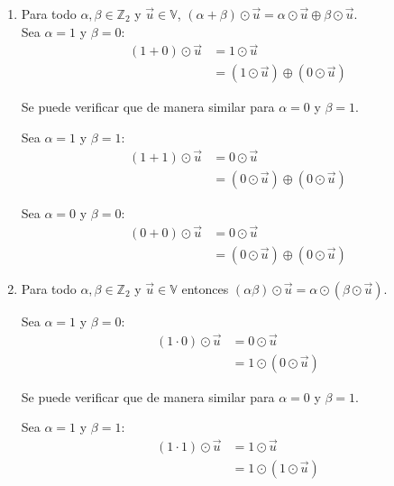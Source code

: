 \documentclass{report}
\begin{document}
\begin{enumerate}
\begin{enumerate}
\begin{enumerate}
                    \item Para todo $\alpha, \beta \in \mathbb{Z}_2$ y $\vec{u} \in \mathbb{V}$, $(\alpha + \beta) \odot \vec{u} = \alpha \odot \vec{u} \oplus \beta \odot \vec{u}$.\\

                    Sea $\alpha = 1$ y $\beta = 0$:
                    \begin{align*}
                        (1 + 0) \odot \vec{u} &= 1 \odot \vec{u} \\
                        &= (1 \odot \vec{u}) \oplus (0 \odot \vec{u})
                    \end{align*}

                    Se puede verificar que de manera similar para $\alpha = 0$ y $\beta = 1$.

                    Sea $\alpha = 1$ y $\beta = 1$:
                    \begin{align*}
                        (1 + 1) \odot \vec{u} &= 0 \odot \vec{u} \\
                        &= (0 \odot \vec{u}) \oplus (0 \odot \vec{u})
                    \end{align*}

                    Sea $\alpha = 0$ y $\beta = 0$:
                    \begin{align*}
                        (0 + 0) \odot \vec{u} &= 0 \odot \vec{u} \\
                        &= (0 \odot \vec{u}) \oplus (0 \odot \vec{u})
                    \end{align*}

                    \item Para todo $\alpha, \beta \in \mathbb{Z}_2$ y $\vec{u} \in \mathbb{V}$ entonces $(\alpha \beta) \odot \vec{u} = \alpha \odot (\beta \odot \vec{u})$.

                    Sea $\alpha = 1$ y $\beta = 0$:
                    \begin{align*}
                        (1 \cdot 0) \odot \vec{u} &= 0 \odot \vec{u} \\
                        &= 1 \odot (0 \odot \vec{u})
                    \end{align*}

                    Se puede verificar que de manera similar para $\alpha = 0$ y $\beta = 1$.

                    Sea $\alpha = 1$ y $\beta = 1$:
                    \begin{align*}
                        (1 \cdot 1) \odot \vec{u} &= 1 \odot \vec{u} \\
                        &= 1 \odot (1 \odot \vec{u})
                    \end{align*}


\end{enumerate}
\end{enumerate}
\end{enumerate}
\end{document}
